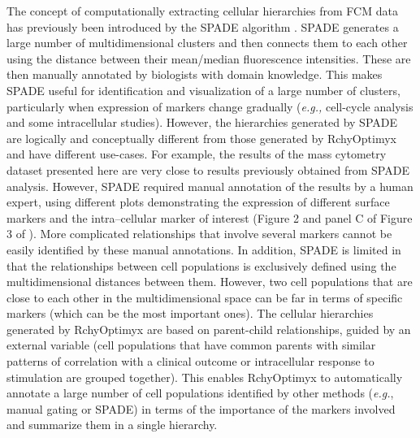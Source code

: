 The concept of computationally extracting cellular hierarchies from FCM data has previously been introduced by the SPADE algorithm \cite{bendall2011single, qiu2011extracting}.
SPADE generates a large number of multidimensional clusters and then connects them to each other using the distance between their mean/median fluorescence intensities. 
These are then manually annotated by biologists with domain knowledge.
This makes SPADE useful for identification and visualization of a large number of clusters, particularly when expression of markers change gradually (\emph{e.g.,} cell-cycle analysis and some intracellular studies).
However, the hierarchies generated by SPADE are logically and conceptually different from those generated by RchyOptimyx and have different use-cases.
For example, the results of the mass cytometry dataset presented here are very close to results previously obtained from SPADE analysis.
However, SPADE required manual annotation of the results by a human expert, using different plots demonstrating the expression of different surface markers and the intra--cellular marker of interest (Figure 2 and panel C of Figure 3 of \cite{bendall2011single}).
More complicated relationships that involve several markers cannot be easily identified by these manual annotations.
In addition, SPADE is limited in that the relationships between cell populations is exclusively defined using the multidimensional distances between them.
However, two cell populations that are close to each other in the multidimensional space can be far in terms of specific markers (which can be the most important ones).
The cellular hierarchies generated by RchyOptimyx are based on parent-child relationships, guided by an external variable (cell populations that have common parents with similar patterns of correlation with a clinical outcome or intracellular response to stimulation are grouped together).
This enables RchyOptimyx to automatically annotate a large number of cell populations identified by other methods (\emph{e.g.}, manual gating or SPADE) in terms of the importance of the markers involved and summarize them in a single hierarchy.


